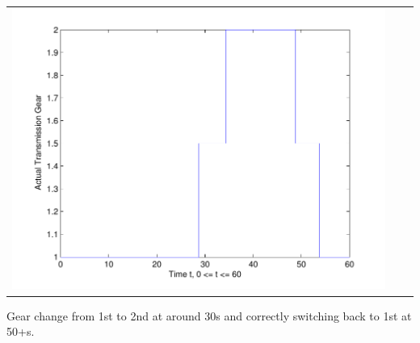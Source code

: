 \documentclass{seminar}
\begin{document}
\begin{slide}
\begin{tabular}{ccc}
\includegraphics[angle=0,scale=0.22]{Gear-tps80-grade2-2} 
\end{tabular}

Gear change from 1st to 2nd at around 30s and correctly
switching back to 1st at 50+s.
\end{slide}
\end{document}
